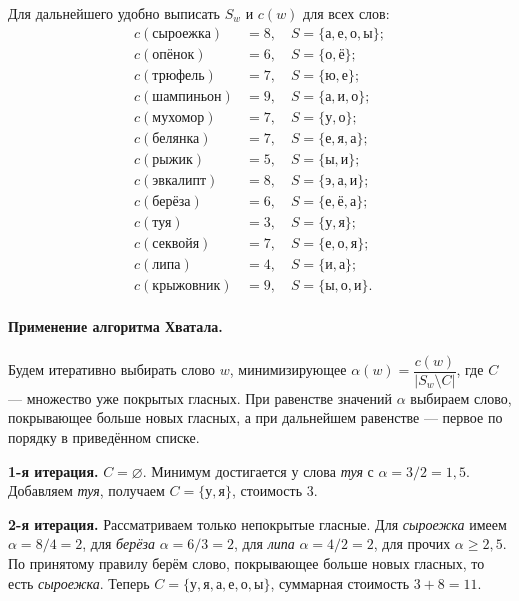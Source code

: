 \documentclass[12pt]{article}
\begin{document}
  Для дальнейшего удобно выписать \(S_w\) и \(c(w)\) для всех слов:
  \begin{align*}
    c(\text{сыроежка}) &= 8, \quad S = \{\text{а},\text{е},\text{о},\text{ы}\}; \\
    c(\text{опёнок}) &= 6, \quad S = \{\text{о},\text{ё}\}; \\
    c(\text{трюфель}) &= 7, \quad S = \{\text{ю},\text{е}\}; \\
    c(\text{шампиньон}) &= 9, \quad S = \{\text{а},\text{и},\text{о}\}; \\
    c(\text{мухомор}) &= 7, \quad S = \{\text{у},\text{о}\}; \\
    c(\text{белянка}) &= 7, \quad S = \{\text{е},\text{я},\text{а}\}; \\
    c(\text{рыжик}) &= 5, \quad S = \{\text{ы},\text{и}\}; \\
    c(\text{эвкалипт}) &= 8, \quad S = \{\text{э},\text{а},\text{и}\}; \\
    c(\text{берёза}) &= 6, \quad S = \{\text{е},\text{ё},\text{а}\}; \\
    c(\text{туя}) &= 3, \quad S = \{\text{у},\text{я}\}; \\
    c(\text{секвойя}) &= 7, \quad S = \{\text{е},\text{о},\text{я}\}; \\
    c(\text{липа}) &= 4, \quad S = \{\text{и},\text{а}\}; \\
    c(\text{крыжовник}) &= 9, \quad S = \{\text{ы},\text{о},\text{и}\}.
  \end{align*}

  \paragraph{Применение алгоритма Хватала.}
  Будем итеративно выбирать слово \(w\), минимизирующее \(\alpha(w)=\dfrac{c(w)}{|S_w\setminus C|}\), где \(C\) — множество уже покрытых гласных. При равенстве значений \(\alpha\) выбираем слово, покрывающее больше новых гласных, а при дальнейшем равенстве — первое по порядку в приведённом списке.

  \textbf{1-я итерация.} \(C=\varnothing\). Минимум достигается у слова \emph{туя} с \(\alpha=3/2=1{,}5\). Добавляем \emph{туя}, получаем \(C=\{\text{у},\text{я}\}\), стоимость \(3\).

  \textbf{2-я итерация.} Рассматриваем только непокрытые гласные. Для \emph{сыроежка} имеем \(\alpha=8/4=2\), для \emph{берёза} \(\alpha=6/3=2\), для \emph{липа} \(\alpha=4/2=2\), для прочих \(\alpha\ge 2{,}5\). По принятому правилу берём слово, покрывающее больше новых гласных, то есть \emph{сыроежка}. Теперь \(C=\{\text{у},\text{я},\text{а},\text{е},\text{о},\text{ы}\}\), суммарная стоимость \(3+8=11\).
\end{document}
